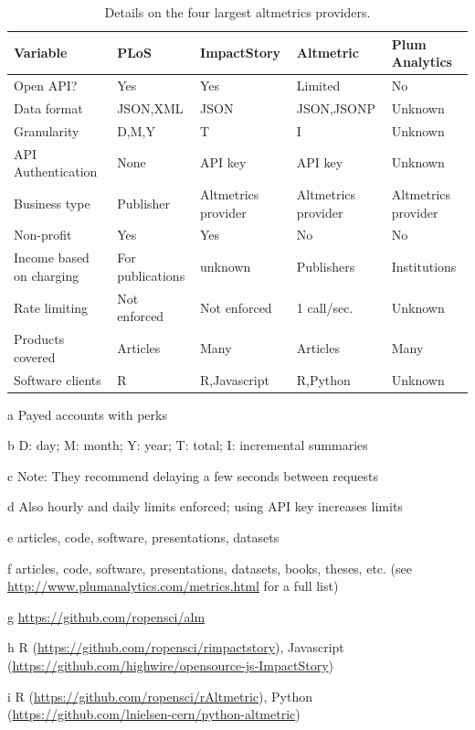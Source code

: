 \documentclass[letterpaper,superscriptaddress,showkeys,longbibliography]{revtex4-1}\usepackage{graphicx, color}
\begin{document}
\begin{table}[!ht]
    \begin{threeparttable}[b]
    \caption{Details on the four largest altmetrics providers.}\label{tab:a} %
        \begin{tabular}{|l|l|l|l|l|}
            \hline
            Variable & PLoS & ImpactStory & Altmetric & Plum Analytics \\
            \hline
            Open API? & Yes & Yes & Limited\tnote{d} & No \\
            Data format & JSON,XML & JSON & JSON,JSONP & Unknown \\
            Granularity\tnote{b} & D,M,Y & T & I & Unknown \\
            API Authentication & None & API key & API key & Unknown \\
            Business type & Publisher & Altmetrics provider & Altmetrics provider & Altmetrics provider \\
            Non-profit & Yes & Yes & No & No \\
            Income based on charging & For publications & unknown & Publishers & Institutions \\
            Rate limiting & Not enforced & Not enforced\tnote{c} & 1 call/sec.\tnote{d} & Unknown \\
            Products covered & Articles & Many\tnote{e} & Articles & Many\tnote{f} \\
            Software clients & R\tnote{g} & R,Javascript\tnote{h} & R,Python\tnote{i} & Unknown \\
            \hline
        \end{tabular}
        \begin{tablenotes}
            \item[a] Payed accounts with perks
            \item[b] D: day; M: month; Y: year; T: total; I: incremental summaries
            \item[c] Note: They recommend delaying a few seconds between requests
            \item[d] Also hourly and daily limits enforced; using API key increases limits
            \item[e] articles, code, software, presentations, datasets
            \item[f] articles, code, software, presentations, datasets, books, theses, etc. (see \url{http://www.plumanalytics.com/metrics.html} for a full list)
            \item[g] \url{https://github.com/ropensci/alm}
            \item[h] R (\url{https://github.com/ropensci/rimpactstory}), Javascript (\url{https://github.com/highwire/opensource-js-ImpactStory})
            \item[i] R (\url{https://github.com/ropensci/rAltmetric}), Python (\url{https://github.com/lnielsen-cern/python-altmetric})
        \end{tablenotes}
    \end{threeparttable}
\end{table}
\end{document}
